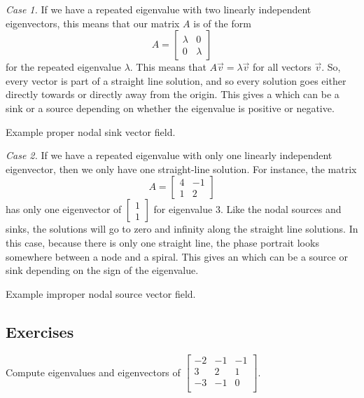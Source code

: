 \emph{Case 1.} If we have a repeated eigenvalue with two linearly independent eigenvectors, this means that our matrix $A$ is of the form
\[ A = \begin{bmatrix} \lambda & 0 \\ 0 & \lambda \end{bmatrix} \] for the repeated eigenvalue $\lambda$. This means that $A \vec{v} = \lambda \vec{v}$ for all vectors $\vec{v}$. So, every vector is part of a straight line solution, and so every solution goes either directly towards or directly away from the origin. This gives a \emph{} which can be a sink or a source depending on whether the eigenvalue is positive or negative. 

\begin{myfig}
\capstart
{}
\caption{Example proper nodal sink vector field.\label{pln:proper-sinkfig}}
\end{myfig}

\emph{Case 2.} If we have a repeated eigenvalue with only one linearly independent eigenvector, then we only have one straight-line solution. For instance, the matrix 
\[ A = \begin{bmatrix} 4 & -1 \\ 1 & 2 \end{bmatrix} \] has only one eigenvector of $\begin{bmatrix} 1 \\ 1 \end{bmatrix}$ for eigenvalue $3$. Like the nodal sources and sinks, the solutions will go to zero and infinity along the straight line solutions. In this case, because there is only one straight line, the phase portrait looks somewhere between a node and a spiral. This gives an \emph{} which can be a source or sink depending on the sign of the eigenvalue.

\begin{myfig}
\capstart
{}
\caption{Example improper nodal source vector field.\label{pln:improper-sourcefig}}
\end{myfig}

\subsection{Exercises}

\begin{exercise}
Compute eigenvalues and eigenvectors of
$\left[ \begin{smallmatrix}
-2 & -1 & -1 \\
3 & 2 & 1 \\
-3 & -1 & 0 \\
\end{smallmatrix} \right]$.
\end{exercise}

